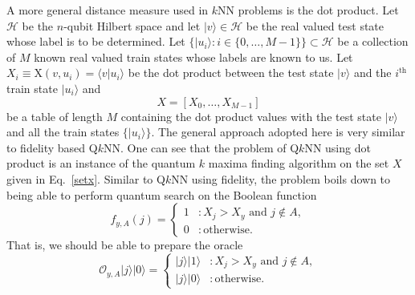 \documentclass[a4paper,twocolumn,11pt,unpublished]{quantumarticle}
\newcommand{\rang}{\rangle}
\newcommand{\lang}{\langle}
\begin{document}
    A more general distance measure used in $k$NN problems is the dot product. Let $\mathcal{H}$ be the $n$-qubit Hilbert space and let $|v\rang \in \mathcal H $ be the real valued test state whose label is to be determined. Let $\{|u_i\rangle : i \in \{0, \ldots, M-1\}\} \subset \mathcal H$ be a collection of $M$ known real valued train states whose labels are known to us. Let $X_i \equiv \text{X}(v, u_i) = \lang v|u_i \rang$ be the dot product between the test state $|v\rang$ and the $i^\text{th}$ train state $|u_i\rang$ and  
    \begin{equation}\label{setx}
        X = [X_0, \ldots, X_{M-1}]
    \end{equation} 
    be a table of length $M$ containing the dot product values with the test state $|v\rangle$ and all the train states $\{| u_i \rang\}$. 
    The general approach adopted here is very similar to fidelity based  Q$k$NN. 
    One can see that the problem of Q$k$NN using dot product is an instance of the quantum $k$ maxima finding algorithm on the set $X$ given in Eq.~\eqref{setx}. Similar to Q$k$NN using fidelity, the problem boils down to being able to perform quantum search on the Boolean function
    \begin{equation}
        f_{y,A}(j)  = 
        \begin{cases}
            1 &: X_j > X_y \text{ and } j \notin A,\\
            0 &: \text{otherwise}.                        
        \end{cases}
    \end{equation} \label{boolean_dp}
    That is, we should be able to prepare the oracle
    \begin{equation} \label{dotporacle}
        \mathcal O_{y, A}|j\rang|0\rang =
        \begin{cases}
        |j\rang|1\rang & : X_j > X_y \text{ and } j \notin A,\\
        |j\rang |0\rang &: \text{otherwise}.
        \end{cases}
    \end{equation} 
    
    
       
\end{document}
